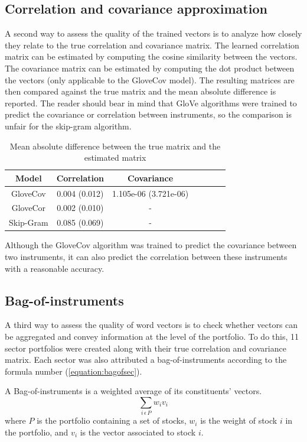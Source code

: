 \documentclass[a4paper, 11pt]{article}
\begin{document}
\subsection{Correlation and covariance approximation}
A second way to assess the quality of the trained vectors is to analyze how closely they relate to the true correlation and covariance matrix. The learned correlation matrix can be estimated by computing the cosine similarity between the vectors. The covariance matrix can be estimated by computing the dot product between the vectors (only applicable to the GloveCov model). The resulting matrices are then compared against the true matrix and the mean absolute difference is reported. The reader should bear in mind that GloVe algorithms were trained to predict the covariance or correlation between instruments, so the comparison is unfair for the skip-gram algorithm.

\begin{table}[h]
\begin{center}
\begin{tabular}{|c|c|c|c|c|c|c|}
  \hline
  Model & Correlation & Covariance \\
  \hline
  GloveCov & 0.004 (0.012) & 1.105e-06 (3.721e-06)\\
  GloveCor & 0.002 (0.010) & -\\
  Skip-Gram & 0.085 (0.069) & -\\
  \hline
\end{tabular}
\end{center}
\caption{Mean absolute difference between the true matrix and the estimated matrix}
\label{table:correstimation}
\end{table}
Although the GloveCov algorithm was trained to predict the covariance between two instruments, it can also predict the correlation between these instruments with a reasonable accuracy.


\subsection{Bag-of-instruments}
A third way to assess the quality of word vectors is to check whether vectors can be aggregated and convey information at the level of the portfolio. To do this, 11 sector portfolios were created along with their true correlation and covariance matrix. Each sector was also attributed a bag-of-instruments according to the formula number (\ref{equation:bagofsec}).

A Bag-of-instruments is a weighted average of its constituents' vectors.
\begin{equation}
\sum_{i\, \epsilon \, P} w_iv_i
\label{equation:bagofsec}
\end{equation}
where \(P\) is the portfolio containing a set of stocks, \(w_i\) is the weight of stock \(i\) in the portfolio, and \(v_i\) is the vector associated to stock \(i\).
\end{document}
